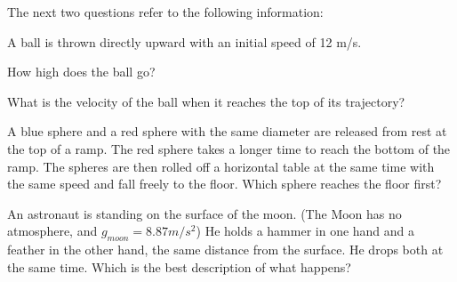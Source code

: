 \documentclass[10pt]{examdesign}
\begin{document}
\begin{multiplechoice} [title={Multiple Choice},
	rearrange=yes]
\begin{block}
The next two questions refer to the following information:

	A ball is thrown directly upward with an initial speed of 12 m/s. 
	
\begin{question}
  How high does the ball go?
\end{question}

\begin{question}
What is the velocity of the ball when it reaches the top of its trajectory?

	\end{question}



\end{block}

\begin{question}
A blue sphere and a red sphere with the same diameter are released from rest at the top of a ramp. The red sphere takes a longer time to reach the bottom of the ramp. The spheres are then rolled off a horizontal table at the same time with the same speed and fall freely to the floor. Which sphere reaches the floor first? 
\end{question}

\begin{question}
	An astronaut is standing on the surface of the moon.  (The Moon has no atmosphere, and $g_{moon} = 8.87 m/s^2$)  He holds a hammer in one hand and a feather in the other hand, the same distance from the surface.  He drops both at the same time.  Which is the best description of what happens?
\end{question}




\end{multiplechoice}
\end{document}
